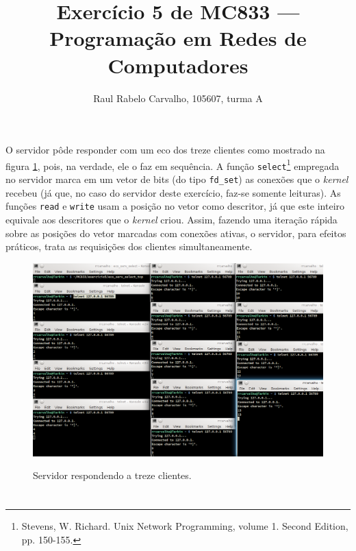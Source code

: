 \documentclass[a4paper,10pt,oneside,final,titlepage,onecolumn]{article}
\title{Exercício 5 de MC833 --- Programação em Redes de Computadores}
\author{Raul Rabelo Carvalho, 105607, turma A}
\begin{document}
\maketitle



\section{}
\paragraph{}O servidor pôde responder com um eco dos treze clientes como mostrado na figura \ref{echo}, pois, na verdade, ele o faz em sequência. A função \verb|select|\footnote{Stevens, W. Richard. Unix Network Programming, volume 1. Second Edition, pp. 150-155.} empregada no servidor marca em um vetor de bits (do tipo \verb|fd_set|) as conexões que o \emph{kernel} recebeu (já que, no caso do servidor deste exercício, faz-se somente leituras). As funções \verb|read| e \verb|write| usam a posição no vetor como descritor, já que este inteiro equivale aos descritores que o \emph{kernel} criou. Assim, fazendo uma iteração rápida sobre as posições do vetor marcadas com conexões ativas, o servidor, para efeitos práticos, trata as requisições dos clientes simultaneamente.
\begin{figure}[!ht]
  \caption{Servidor respondendo a treze clientes.}
  \centering
  \includegraphics[width=150mm]{images/echo.png}
  \label{echo}
\end{figure}



\FloatBarrier
\section{}
\end{document}
